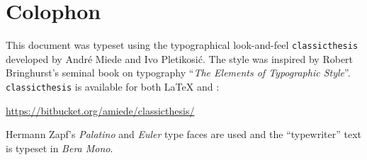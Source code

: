 \pagestyle{empty}

\hfill

\vfill

\section*{Colophon}
This document was typeset using the typographical look-and-feel \texttt{classicthesis} developed by Andr\'e Miede and Ivo Pletikosić.
The style was inspired by Robert Bringhurst's seminal book on typography ``\emph{The Elements of Typographic Style}''.
\texttt{classicthesis} is available for both \LaTeX{} and \mLyX{}:
\begin{center}
    \url{https://bitbucket.org/amiede/classicthesis/}
\end{center}

\bigskip

\noindent\finalVersionString

Hermann Zapf's \emph{Palatino} and \emph{Euler} type faces are used and the ``typewriter'' text is typeset in \emph{Bera Mono}.
